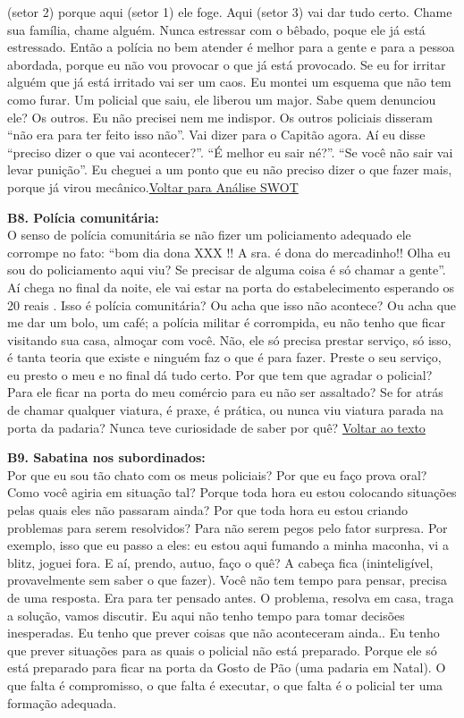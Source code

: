 \documentclass[
	12pt,				%
	openright,			%
	twoside,			%
	a4paper,			%
	chapter=TITLE,		%
	section=TITLE,		%
	subsection=TITLE,	%
	subsubsection=TITLE,%
	spanish,            %
	english,			%
	brazil				%
	]{abntex2}
\begin{document}
\begin{anexosenv}
(setor 2) porque aqui (setor 1) ele foge. Aqui (setor 3) vai dar tudo certo. Chame sua família, chame alguém. Nunca estressar com o bêbado, poque ele já está estressado. Então a polícia no bem atender é melhor para a gente e para a pessoa abordada, porque eu não vou provocar o que já está provocado. Se eu for irritar alguém que já está irritado vai ser um caos. Eu montei um esquema que não tem como furar. Um policial que saiu, ele liberou um major. Sabe quem denunciou ele? Os outros. Eu não precisei nem me indispor. Os outros policiais disseram “não era para ter feito isso não”. Vai dizer para o Capitão agora. Aí eu disse “preciso dizer o que vai acontecer?”. “É melhor eu sair né?”. “Se você não sair vai levar punição”. Eu cheguei a um ponto que eu não preciso dizer o que fazer mais, porque já virou mecânico.\hyperlink{W2}{Voltar para Análise SWOT}
	\hypertarget{B8}{}
	\par
\textbf{B8. Polícia comunitária:} \\
	O senso de polícia comunitária se não fizer um policiamento adequado ele corrompe no fato: “bom dia dona XXX !! A sra. é dona do mercadinho!! Olha eu sou do policiamento aqui viu? Se precisar de alguma coisa é só chamar a gente”. Aí chega no final da noite, ele vai estar na porta do estabelecimento esperando os 20 reais . Isso é polícia comunitária? Ou acha que isso não acontece? Ou acha que me dar um bolo, um café; a polícia militar é corrompida, eu não tenho que ficar visitando sua casa, almoçar com você. Não, ele só precisa prestar serviço, só isso, é tanta teoria que existe e ninguém faz o que é para fazer. Preste o seu serviço, eu presto o meu e no final dá tudo certo. Por que tem que agradar o policial? Para ele ficar na porta do meu comércio para eu não ser assaltado?  Se for atrás de chamar qualquer viatura, é praxe, é prática, ou nunca viu viatura parada na porta da padaria? Nunca teve curiosidade de saber por quê?
	\hyperlink{PC}{Voltar ao texto}
	\hypertarget{B9}{}
	\par
	\textbf{B9. Sabatina nos subordinados:} \\
	Por que eu sou tão chato com os meus policiais? Por que eu faço prova oral? Como você agiria em situação tal? Porque toda hora eu estou colocando situações pelas quais eles não passaram ainda? Por que toda hora eu estou criando problemas para serem resolvidos?  Para não serem pegos pelo fator surpresa. Por exemplo, isso que eu passo a eles: eu estou aqui fumando a minha maconha, vi a blitz, joguei fora. E aí, prendo, autuo, faço o quê? A cabeça fica (ininteligível, provavelmente sem saber o que fazer). Você não tem tempo para pensar, precisa de uma resposta. Era para ter pensado antes. O problema, resolva em casa, traga a solução, vamos discutir. Eu aqui não tenho tempo para tomar decisões inesperadas. Eu tenho que prever coisas que não aconteceram ainda.. Eu tenho que prever situações para as quais o policial não está preparado. Porque ele só está preparado para ficar na porta da Gosto de Pão (uma padaria em Natal). O que falta é compromisso, o que falta é executar, o que falta é o policial ter uma formação adequada.

\end{anexosenv}
\end{document}
